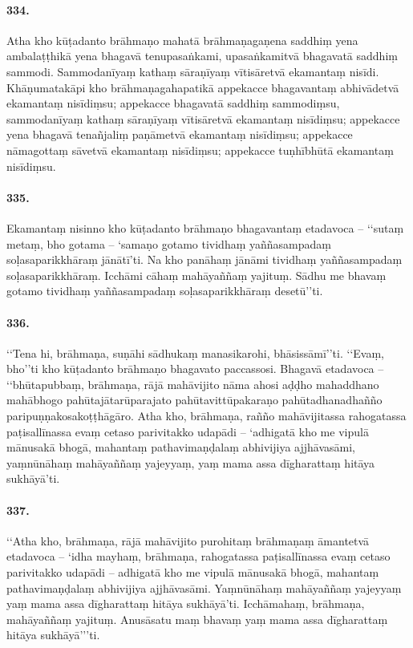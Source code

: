 \paragraph{334.} Atha kho kūṭadanto brāhmaṇo mahatā brāhmaṇagaṇena saddhiṃ yena ambalaṭṭhikā yena bhagavā tenupasaṅkami, upasaṅkamitvā bhagavatā saddhiṃ sammodi. Sammodanīyaṃ kathaṃ sāraṇīyaṃ vītisāretvā ekamantaṃ nisīdi. Khāṇumatakāpi kho brāhmaṇagahapatikā appekacce bhagavantaṃ abhivādetvā ekamantaṃ nisīdiṃsu; appekacce bhagavatā saddhiṃ sammodiṃsu, sammodanīyaṃ kathaṃ sāraṇīyaṃ vītisāretvā ekamantaṃ nisīdiṃsu; appekacce yena bhagavā tenañjaliṃ paṇāmetvā ekamantaṃ nisīdiṃsu; appekacce nāmagottaṃ sāvetvā ekamantaṃ nisīdiṃsu; appekacce tuṇhībhūtā ekamantaṃ nisīdiṃsu.

\paragraph{335.} Ekamantaṃ nisinno kho kūṭadanto brāhmaṇo bhagavantaṃ etadavoca – ‘‘sutaṃ metaṃ, bho gotama – ‘samaṇo gotamo tividhaṃ yaññasampadaṃ soḷasaparikkhāraṃ jānātī’ti. Na kho panāhaṃ jānāmi tividhaṃ yaññasampadaṃ soḷasaparikkhāraṃ. Icchāmi cāhaṃ mahāyaññaṃ yajituṃ. Sādhu me bhavaṃ gotamo tividhaṃ yaññasampadaṃ soḷasaparikkhāraṃ desetū’’ti.

\paragraph{336.} ‘‘Tena hi, brāhmaṇa, suṇāhi sādhukaṃ manasikarohi, bhāsissāmī’’ti. ‘‘Evaṃ, bho’’ti kho kūṭadanto brāhmaṇo bhagavato paccassosi. Bhagavā etadavoca – ‘‘bhūtapubbaṃ, brāhmaṇa, rājā mahāvijito nāma ahosi aḍḍho mahaddhano mahābhogo pahūtajātarūparajato pahūtavittūpakaraṇo pahūtadhanadhañño paripuṇṇakosakoṭṭhāgāro. Atha kho, brāhmaṇa, rañño mahāvijitassa rahogatassa paṭisallīnassa evaṃ cetaso parivitakko udapādi – ‘adhigatā kho me vipulā mānusakā bhogā, mahantaṃ pathavimaṇḍalaṃ abhivijiya ajjhāvasāmi, yaṃnūnāhaṃ mahāyaññaṃ yajeyyaṃ, yaṃ mama assa dīgharattaṃ hitāya sukhāyā’ti.

\paragraph{337.} ‘‘Atha kho, brāhmaṇa, rājā mahāvijito purohitaṃ brāhmaṇaṃ āmantetvā etadavoca – ‘idha mayhaṃ, brāhmaṇa, rahogatassa paṭisallīnassa evaṃ cetaso parivitakko udapādi – adhigatā kho me vipulā mānusakā bhogā, mahantaṃ pathavimaṇḍalaṃ abhivijiya ajjhāvasāmi. Yaṃnūnāhaṃ mahāyaññaṃ yajeyyaṃ yaṃ mama assa dīgharattaṃ hitāya sukhāyā’ti. Icchāmahaṃ, brāhmaṇa, mahāyaññaṃ yajituṃ. Anusāsatu maṃ bhavaṃ yaṃ mama assa dīgharattaṃ hitāya sukhāyā’’’ti.

